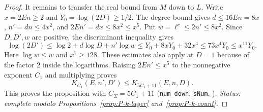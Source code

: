 \begin{proof}
It remains to transfer the real bound from $M$ down to $L$.
Write $x=2En\ge2$ and $Y_0=\log(2D)\ge1/2$.
The degree bound gives $d\le16En=8x$, $n'=dn\le4x^2$, and
$2En'=dx\le8x^2\le x^5$. Put $w=\ell^c\le2n'\le8x^2$. Since $D,D',w$
are positive, the discriminant inequality gives
\[
 \log(2D')\le \log2+d\log D+n'\log w
             \le Y_0+8xY_0+32x^4
             \le73x^4Y_0\le x^{11}Y_0 .
\]
Here $\log w\le w$ and $x^7\ge128$. These estimates also apply at $D=1$
because of the factor $2$ inside the logarithms. Raising $2En'\le x^5$
to the nonnegative exponent $C_1$ and multiplying proves
\[
  K_{C_1}(E,n',D')\le K_{5C_1+11}(E,n,D).
\]
This proves the proposition with $C_\Sigma=5C_1+11$
(\nolinkurl{num_down}, \nolinkurl{sNum}, ).
\emph{Status: complete modulo Propositions~\ref{prop:P-k-layer}
and~\ref{prop:P-k-count}.}
\end{proof}

